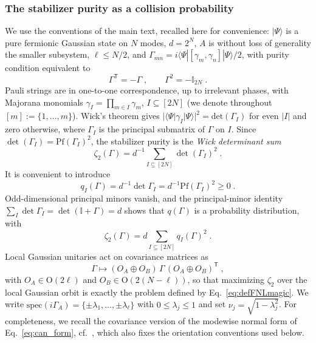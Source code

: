 \documentclass[prx,twocolumn,superscriptaddress,aps,10pt, frontmatterverbose, reprint,footinbib,longbibliography=true]{revtex4-2}
\newcommand{\trans}{\mathsf{T}}
\begin{document}
\subsubsection{The stabilizer purity as a collision probability}
\label{app:proof:dpp}

We use the conventions of the main text, recalled here for convenience: $|\Psi\rangle$ is a pure fermionic Gaussian state on $N$ modes, $d=2^N$, $A$ is without loss of generality the smaller subsystem, $\ell\le N/2$,  and $\Gamma_{mn}=i\langle\Psi|[\gamma_m,\gamma_n]|\Psi\rangle/2$, with purity condition equivalent to
\begin{equation}
    \Gamma^{\trans}=-\Gamma\;,\qquad \Gamma^2=-\mathbb{I}_{2N}\;.
    \label{eq:pure-covariance}
\end{equation}
Pauli strings are in one-to-one correspondence, up to irrelevant phases, with Majorana monomials $\gamma_I=\prod_{m\in I}\gamma_m$, $I\subseteq[2N]$ (we denote throughout $[m]:=\{1,\dots,m\}$). Wick's theorem gives $|\langle\Psi|\gamma_I|\Psi\rangle|^2=\mathrm{det}(\Gamma_I)$ for even $|I|$ and zero otherwise, where $\Gamma_I$ is the principal submatrix of $\Gamma$ on $I$. Since $\det(\Gamma_I)=\mathrm{Pf}(\Gamma_I)^2$, the stabilizer purity is the \emph{Wick determinant sum}
\begin{equation}
    \zeta_2(\Gamma)=d^{-1}\sum_{I\subseteq[2N]}\det(\Gamma_I)^2\;.
    \label{eq:zeta-M}
\end{equation}
It is convenient to introduce
\begin{equation}
    q_I(\Gamma)=d^{-1}\det\Gamma_I=d^{-1}\mathrm{Pf}(\Gamma_I)^2\ge 0\;.
    \label{eq:q-definition}
\end{equation}
Odd-dimensional principal minors vanish, and the principal-minor identity $\sum_I\det\Gamma_I=\det(\mathbb{I}+\Gamma)=d$ shows that $q(\Gamma)$ is a probability distribution, with
\begin{equation}
    \zeta_2(\Gamma)=d\sum_{I\subseteq[2N]} q_I(\Gamma)^2\;.
    \label{eq:q-collision}
\end{equation}
Local Gaussian unitaries act on covariance matrices as
\begin{equation}
    \Gamma\longmapsto (O_A\oplus O_B)\,\Gamma\,(O_A\oplus O_B)^{\trans}\;,
    \label{eq:local-action}
\end{equation}
with $O_A\in\mathrm{O}(2\ell)$ and $O_B\in\mathrm{O}(2(N-\ell))$, so that maximizing $\zeta_2$ over the local Gaussian orbit is exactly the problem defined by Eq.~\eqref{eq:defFNLmagic}.
 We write $\mathrm{spec}(i\Gamma_A)=\{\pm\lambda_1,\dots,\pm\lambda_\ell\}$ with $0\le\lambda_j\le 1$ and set $\nu_j=\sqrt{1-\lambda_j^2}$.
For completeness, we recall the covariance version of the modewise normal form of Eq.~\eqref{eq:can_form}, cf.~\cite{BoteroReznik2004}, which also fixes the orientation conventions used below. 
\end{document}
